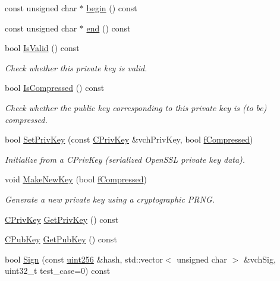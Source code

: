 \begin{DoxyCompactItemize}
const unsigned char $\ast$ \mbox{\hyperlink{class_c_key_ab8dee0ad9d933304a22284ee40040847}{begin}} () const
\item 
const unsigned char $\ast$ \mbox{\hyperlink{class_c_key_a41c700c4a732672e4b7cc60d811dbf41}{end}} () const
\item 
bool \mbox{\hyperlink{class_c_key_a56e06c48d504a1a65e244e5fc35cdecc}{Is\+Valid}} () const
\begin{DoxyCompactList}\small\item\em Check whether this private key is valid. \end{DoxyCompactList}\item 
bool \mbox{\hyperlink{class_c_key_a96b017433a65335775cf3807d73f85ce}{Is\+Compressed}} () const
\begin{DoxyCompactList}\small\item\em Check whether the public key corresponding to this private key is (to be) compressed. \end{DoxyCompactList}\item 
bool \mbox{\hyperlink{class_c_key_aa62c082c9037565fce02b457cc335e7b}{Set\+Priv\+Key}} (const \mbox{\hyperlink{key_8h_a1da569b8b6e5b3fa1196cc1b877e7f54}{C\+Priv\+Key}} \&vch\+Priv\+Key, bool \mbox{\hyperlink{class_c_key_a9e5f8cac8811466c735d7af6f17a0dfe}{f\+Compressed}})
\begin{DoxyCompactList}\small\item\em Initialize from a C\+Priv\+Key (serialized Open\+S\+SL private key data). \end{DoxyCompactList}\item 
void \mbox{\hyperlink{class_c_key_a9d12ed9d297e4286250fd7ea6b59e1a5}{Make\+New\+Key}} (bool \mbox{\hyperlink{class_c_key_a9e5f8cac8811466c735d7af6f17a0dfe}{f\+Compressed}})
\begin{DoxyCompactList}\small\item\em Generate a new private key using a cryptographic P\+R\+NG. \end{DoxyCompactList}\item 
\mbox{\hyperlink{key_8h_a1da569b8b6e5b3fa1196cc1b877e7f54}{C\+Priv\+Key}} \mbox{\hyperlink{class_c_key_a91b6ecf71cc16e0b05ce79ec9276e729}{Get\+Priv\+Key}} () const
\item 
\mbox{\hyperlink{class_c_pub_key}{C\+Pub\+Key}} \mbox{\hyperlink{class_c_key_aa1085c59603a62db6ec776300f250337}{Get\+Pub\+Key}} () const
\item 
bool \mbox{\hyperlink{class_c_key_aa9b184a4a71d3e1a40aab360cf68e86c}{Sign}} (const \mbox{\hyperlink{classuint256}{uint256}} \&hash, std\+::vector$<$ unsigned char $>$ \&vch\+Sig, uint32\+\_\+t test\+\_\+case=0) const

\end{DoxyCompactItemize}
